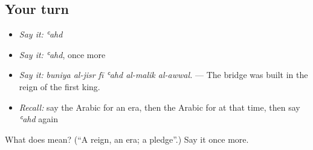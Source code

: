 \subsection*{Your turn}
\begin{itemize}
\raggedright
  \item \emph{Say it:} \emph{ʿahd}
  \item \emph{Say it:} \emph{ʿahd}, once more
  \item \emph{Say it:} \emph{buniya al-jisr fī ʿahd al-malik al-awwal.} — The bridge was built in the reign of the first king.
  \item \emph{Recall:} say the Arabic for an era, then the Arabic for at that time, then say \emph{ʿahd} again
\end{itemize}

\begin{tcolorbox}[breakable,colback=teal!4,colframe=teal!35!black,title={Before you move on}]
What does  mean? (\textquotedblleft{}A reign, an era; a pledge\textquotedblright{}.) Say it once more.
\end{tcolorbox}
